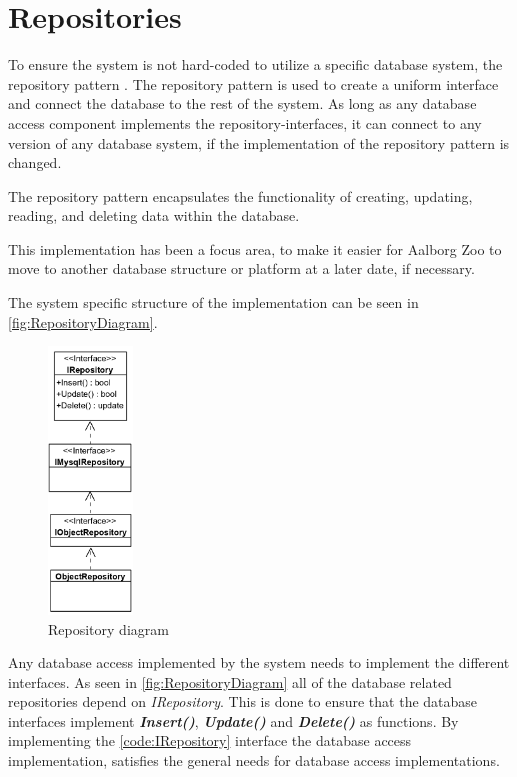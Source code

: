 \section{Repositories} \label{sc:RepositoryPatern}
To ensure the system is not hard-coded to utilize a specific database system, the repository pattern \citep{RepositoryPattern}. The repository pattern is used to create a uniform interface and connect the database to the rest of the system. As long as any database access component implements the repository-interfaces, it can connect to any version of any database system, if the implementation of the repository pattern is changed.
\par
The repository pattern encapsulates the functionality of creating, updating, reading, and deleting data within the database.
\par
This implementation has been a focus area, to make it easier for Aalborg Zoo to move to another database structure or platform at a later date, if necessary.
\par
The system specific structure of the implementation can be seen in \autoref{fig:RepositoryDiagram}.

\begin{figure}[H]
    \centering
    \includegraphics[width=0.2\textwidth]{figures/Implementation/GenericRepositoryStructure.PNG}
    \caption{Repository diagram}
    \label{fig:RepositoryDiagram}
\end{figure}

Any database access implemented by the system needs to implement the different interfaces. As seen in \autoref{fig:RepositoryDiagram} all of the database related repositories depend on \textit{IRepository}. This is done to ensure that the database interfaces implement \textbf{\textit{Insert()}}, \textbf{\textit{Update()}} and \textbf{\textit{Delete()}} as functions. By implementing the \autoref{code:IRepository} interface the database access implementation, satisfies the general needs for database access implementations.

